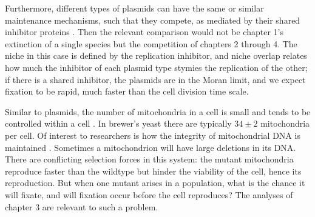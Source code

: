 Furthermore, different types of plasmids can have the same or similar maintenance mechanisms, such that they compete, as mediated by their shared inhibitor proteins \cite{DelSolar1998}. 
Then the relevant comparison would not be chapter 1's extinction of a single species but the competition of chapters 2 through 4. %
The niche in this case is defined by the replication inhibitor, and niche overlap relates how much the inhibitor of each plasmid type stymies the replication of the other; if there is a shared inhibitor, the plasmids are in the Moran limit, and we expect fixation to be rapid, much faster than the cell division time scale. 

Similar to plasmids, the number of mitochondria in a cell is small and tends to be controlled within a cell \cite{Michaels1982,Shuster1988,Taanman1999}. 
In brewer's yeast there are typically $34\pm 2$ mitochondria per cell. 
Of interest to researchers is how the integrity of mitochondrial DNA is maintained \cite{Taanman1999}. 
Sometimes a mitochondrion will have large deletions in its DNA. 
There are conflicting selection forces in this system: the mutant mitochondria reproduce faster than the wildtype but hinder the viability of the cell, hence its reproduction. 
But when one mutant arises in a population, what is the chance it will fixate, and will fixation occur before the cell reproduces? 
The analyses of chapter 3 are relevant to such a problem. 

